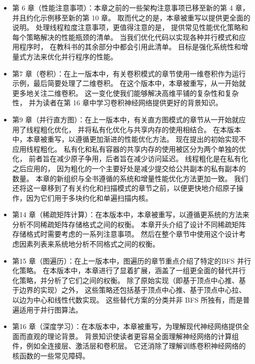 \begin{itemize}
	\item 第 6 章（性能注意事项）：本章之前的一些架构注意事项已移至新的第 4 章，并且约化示例移至新的第 10 章。
		取而代之的是，本章被重写以提供更全面的说明。 处理线程粒度注意事项，更值得注意的是，
		提供常见性能优化策略和每个策略解决的性能瓶颈的清单。 当我们优化代码以实现各种并行模式和应用程序时，
		在教科书的其余部分中都会引用此清单。 目标是强化系统性和增量式方法来优化并行程序的性能。

	\item 第7 章（卷积）：在上一版本中，有关卷积模式的章节使用一维卷积作为运行示例，最后简要处理了二维卷积。 
		在这个版本中，本章被重写，从一开始就更多地关注二维卷积。 这一变化使我们能够解决高维平铺的复杂性和复杂性，
		并为读者在第 16 章中学习卷积神经网络提供更好的背景知识。

	\item 第9 章（并行直方图）：在上一版本中，有关直方图模式的章节从一开始就应用了线程粗化优化，
		并将私有化优化与共享内存的使用相结合。 在本版本中，本章被重写，以遵循更加渐进的性能优化方法。 
		现在提出的初始实现不应用线程粗化。 私有化和私有容器的共享内存的使用被区分为两个单独的优化，
		前者旨在减少原子争用，后者旨在减少访问延迟。 线程粗化是在私有化之后应用的，
		因为粗化的一个主要好处是减少提交给公共副本的私有副本的数量。 
		本章的新组织与全书遵循的系统和增量性能优化方法更加一致。 
		我们还将这一章移到了有关约化和扫描模式的章节之前，以便更快地介绍原子操作，因为它们用于多块约化和单遍扫描内核。

	\item 第14 章（稀疏矩阵计算）：在本版本中，本章被重写，以遵循更系统的方法来分析不同稀疏矩阵存储格式之间的权衡。 
		本章开头介绍了设计不同稀疏矩阵存储格式时需要考虑的一系列注意事项。 
		然后在整个章节中使用这个设计考虑因素列表来系统地分析不同格式之间的权衡。

	\item 第15 章（图遍历）：在上一版本中，图遍历的章节重点介绍了特定的BFS 并行化策略。 
		在本版本中，本章进行了显着扩展，涵盖了一组更全面的替代并行化策略，并分析了它们之间的权衡。 
		除了原始实现（即基于顶点中心推、基于边界的实现）之外，
		这些策略还包括基于顶点中心推、基于顶点中心拉、以边为中心和线性代数实现。 
		这些替代方案的分类并非 BFS 所独有，而是普遍适用于并行图算法。

	\item 第16 章（深度学习）：在本版本中，本章被重写，为理解现代神经网络提供全面而直观的理论背景。 
		背景知识使读者更容易全面理解神经网络的计算组件，例如全连接层、激活层和卷积层。 
		它还消除了理解训练卷积神经网络的核函数的一些常见障碍。


\end{itemize}
